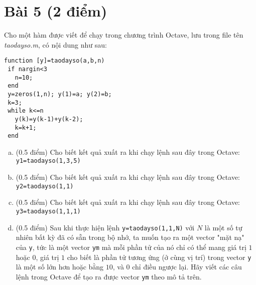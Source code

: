 \documentclass[11pt]{article}
\newcommand{\Solution}{
\medskip
{\bf \underline{Đáp án}:}
}
\begin{document}
\section{Bài 5 (2 điểm)}

Cho một hàm được viết để chạy trong chương trình Octave, lưu trong file tên \textit{taodayso.m}, có nội dung như sau:
\begin{verbatim}
function [y]=taodayso(a,b,n)
 if nargin<3
   n=10;
 end
 y=zeros(1,n); y(1)=a; y(2)=b;
 k=3;
 while k<=n
   y(k)=y(k-1)+y(k-2);
   k=k+1;
 end 
\end{verbatim}

\begin{enumerate}[a).]
 \item (0.5 điểm) Cho biết kết quả xuất ra khi chạy lệnh sau đây trong Octave: 
  \texttt{y1=taodayso(1,3,5)}
 \item (0.5 điểm) Cho biết kết quả xuất ra khi chạy lệnh sau đây trong Octave:
  \texttt{y2=taodayso(1,1)}
 \item (0.5 điểm) Cho biết kết quả xuất ra khi chạy lệnh sau đây trong Octave:
  \texttt{y3=taodayso(1,1,1)}
 \item (0.5 điểm) Sau khi thực hiện lệnh \texttt{y=taodayso(1,1,N)} với $N$ là một số tự nhiên bất kỳ đã có sẵn trong bộ nhớ, ta muốn tạo ra một vector "mặt nạ" của \texttt{y}, tức là một vector \texttt{ym} mà mỗi phần tử của nó chỉ có thể mang giá trị $1$ hoặc $0$, giá trị $1$ cho biết là phần tử tương ứng (ở cùng vị trí) trong vector \texttt{y} là một số lớn hơn hoặc bằng $10$, và $0$ chỉ điều ngược lại. Hãy viết các câu lệnh trong Octave để tạo ra được vector \texttt{ym} theo mô tả trên.
\end{enumerate}

% 
\end{document}
